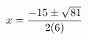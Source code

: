 \documentclass[preview]{standalone}
\begin{document}
\begin{align*}
\special{dvisvgm:raw <g id='unique000'>}x=\frac{-15\pm\sqrt{81}}{2(6)}\special{dvisvgm:raw </g>}
\end{align*}
\end{document}
